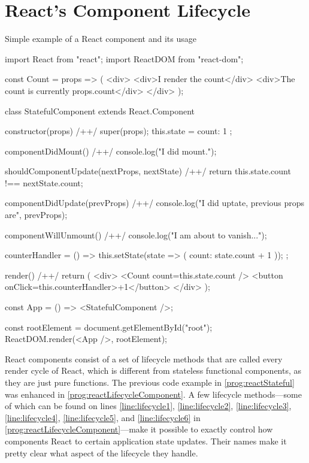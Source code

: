 \section{React's Component Lifecycle}

\begin{program}
\caption{Simple example of a React component and its usage} 
\label{prog:reactLifecycleComponent}
\begin{JsCode}
import React from "react";
import ReactDOM from "react-dom";

const Count = props => (
  <div>
    <div>I render the count</div>
    <div>The count is currently {props.count}</div>
  </div>
);

class StatefulComponent extends React.Component {
  constructor(props) { /+\label{line:lifecycle1}+/
    super(props);
    this.state = {
      count: 1
    };
  }

  componentDidMount() { /+\label{line:lifecycle2}+/
    console.log("I did mount.");
  }

  shouldComponentUpdate(nextProps, nextState) { /+\label{line:lifecycle3}+/
    return this.state.count !== nextState.count;
  }

  componentDidUpdate(prevProps) { /+\label{line:lifecycle4}+/
    console.log("I did uptate, previous props are", prevProps);
  }

  componentWillUnmount() { /+\label{line:lifecycle5}+/
    console.log("I am about to vanish...");
  }

  counterHandler = () => {
    this.setState(state => ({ count: state.count + 1 }));
  };

  render() { /+\label{line:lifecycle6}+/
    return (
      <div>
        <Count count={this.state.count} />
        <button onClick={this.counterHandler}>+1</button>
      </div>
    );
  }
}
  
const App = () => <StatefulComponent />;

const rootElement = document.getElementById("root");
ReactDOM.render(<App />, rootElement);  
\end{JsCode}
\end{program}

React components consist of a set of lifecycle methods that are called every render cycle of React, which is different from stateless functional components, as they are just pure functions. The previous code example in \ref{prog:reactStateful} was enhanced in \ref{prog:reactLifecycleComponent}. A few lifecycle methods---some of which can be found on lines \ref{line:lifecycle1}, \ref{line:lifecycle2}, \ref{line:lifecycle3}, \ref{line:lifecycle4}, \ref{line:lifecycle5}, and \ref{line:lifecycle6} in \ref{prog:reactLifecycleComponent}---make it possible to exactly control how components React to certain application state updates. Their names make it pretty clear what aspect of the lifecycle they handle.

